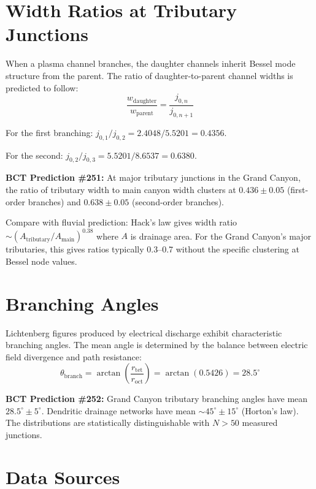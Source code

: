 \documentclass[aps,prl,twocolumn,superscriptaddress]{revtex4-2}
\begin{document}
\section{Width Ratios at Tributary Junctions}

When a plasma channel branches, the daughter channels inherit Bessel mode structure from the parent. The ratio of daughter-to-parent channel widths is predicted to follow:
\begin{equation}
\frac{w_{\mathrm{daughter}}}{w_{\mathrm{parent}}} = \frac{j_{0,n}}{j_{0,n+1}}
\end{equation}

For the first branching: $j_{0,1}/j_{0,2} = 2.4048/5.5201 = 0.4356$.

For the second: $j_{0,2}/j_{0,3} = 5.5201/8.6537 = 0.6380$.

\textbf{BCT Prediction \#251:} At major tributary junctions in the Grand Canyon, the ratio of tributary width to main canyon width clusters at $0.436 \pm 0.05$ (first-order branches) and $0.638 \pm 0.05$ (second-order branches).

Compare with fluvial prediction: Hack's law gives width ratio $\sim (A_{\mathrm{tributary}}/A_{\mathrm{main}})^{0.38}$ where $A$ is drainage area. For the Grand Canyon's major tributaries, this gives ratios typically 0.3--0.7 without the specific clustering at Bessel node values.

\section{Branching Angles}

Lichtenberg figures produced by electrical discharge exhibit characteristic branching angles. The mean angle is determined by the balance between electric field divergence and path resistance:
\begin{equation}
\theta_{\mathrm{branch}} = \arctan\left(\frac{r_{\mathrm{tet}}}{r_{\mathrm{oct}}}\right) = \arctan(0.5426) = 28.5^\circ
\end{equation}

\textbf{BCT Prediction \#252:} Grand Canyon tributary branching angles have mean $28.5^\circ \pm 5^\circ$. Dendritic drainage networks have mean $\sim 45^\circ \pm 15^\circ$ (Horton's law). The distributions are statistically distinguishable with $N > 50$ measured junctions.

\section{Data Sources}
\end{document}
